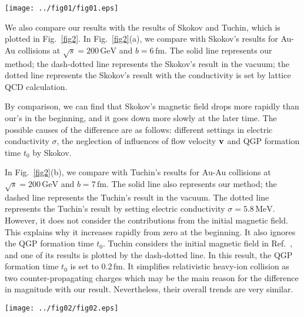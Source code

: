 \documentclass[a4paper,10pt,twoside]{cpc-hepnp}
\begin{document}
\begin{CJK*}{GBK}{song}
\begin{multicols}{2}
\begin{center}
\texttt{[image: ../fig01/fig01.eps]}
\end{center}

We also compare our results with the results of Skokov\cite{McLerran:2013hla} and Tuchin\cite{Tuchin:2013ie,Tuchin:2015oka}, which is plotted in Fig.~\ref{fig2}. In Fig.~\ref{fig2}(a), we compare with Skokov's results for Au-Au collisions at $\sqrt{s} = 200\,\mathrm{GeV}$ and $b = 6\,\mathrm{fm}$. The solid line represents our method; the dash-dotted line represents the Skokov's result in the vacuum; the dotted line represents the Skokov's result with the conductivity is set by lattice QCD calculation.

By comparison, we can find that Skokov's magnetic field drops more rapidly than our's in the beginning, and it goes down more slowly at the later time. The possible causes of the difference are as follows: different settings in electric conductivity $\sigma$, the neglection of influences of flow velocity $\vb{v}$ and QGP formation time $t_0$ by Skokov.

In Fig.~\ref{fig2}(b), we compare with Tuchin's results for Au-Au collisions at $\sqrt{s} = 200\,\mathrm{GeV}$ and $b = 7\,\mathrm{fm}$. The solid line also represents our method; the dashed line represents the Tuchin's result in the vacuum. The dotted line represents the Tuchin's result by setting electric conductivity $\sigma = 5.8\,\mathrm{MeV}$\cite{Tuchin:2013ie}. However, it does not consider the contributions from the initial magnetic field. This explains why it increases rapidly from zero at the beginning. It also ignores the QGP formation time $t_0$. Tuchin considers the initial magnetic field in Ref.~\cite{Tuchin:2015oka}, and one of its results is plotted by the dash-dotted line. In this result, the QGP formation time $t_0$ is set to $0.2\,\mathrm{fm}$. It simplifies relativistic heavy-ion collision as two counter-propagating charges which may be the main reason for the difference in magnitude with our result. Nevertheless, their overall trends are very similar.

\begin{center}
\texttt{[image: ../fig02/fig02.eps]}
\end{center}


\end{multicols}
\end{CJK*}
\end{document}
